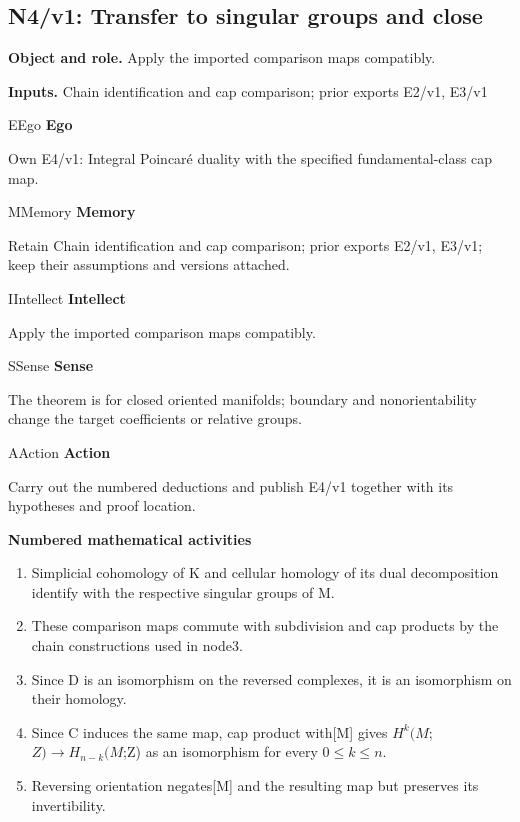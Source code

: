 \documentclass[preprint,12pt,aps,pra,showkeys,amsmath,amssymb,superscriptaddress,floatfix]{revtex4-2}
\theoremstyle{definition}
\theoremstyle{remark}
\newcommand{\mmfaculty}[3]{%
 \begin{mmfacultybox}{#1}{#2}
 {\sffamily\bfseries\color{MMBlue}#2}\par\smallskip #3
 \end{mmfacultybox}}
\newcommand{\field}[2]{\par\smallskip\noindent\textbf{#1.} #2\par}
\begin{document}
\endgroup

\clearpage

\subsection{N4/v1: Transfer to singular groups and close}

\field{Object and role}{Apply the imported comparison maps compatibly.}

\field{Inputs}{Chain identification and cap comparison; prior exports E2/v1, E3/v1}

\mmfaculty{E}{Ego}{Own E4/v1: Integral Poincaré duality with the specified
fundamental-class cap map.}

\mmfaculty{M}{Memory}{Retain Chain identification and cap comparison; prior exports E2/v1,
E3/v1; keep their assumptions and versions attached.}

\mmfaculty{I}{Intellect}{Apply the imported comparison maps compatibly.}

\mmfaculty{S}{Sense}{The theorem is for closed oriented manifolds; boundary and
nonorientability change the target coefficients or relative groups.}

\mmfaculty{A}{Action}{Carry out the numbered deductions and publish E4/v1 together with its
hypotheses and proof location.}

\smallskip\noindent\textbf{Numbered mathematical activities}

\begin{enumerate}[label=N4.\arabic*,leftmargin=3.4em]

\item Simplicial cohomology of K and cellular homology of its dual
decomposition identify with the respective singular groups of M.

\item These comparison maps commute with subdivision and cap products by the
chain constructions used in node3.

\item Since D is an isomorphism on the reversed complexes, it is an
isomorphism on their homology.

\item Since C induces the same map, cap product with{[}M{]} gives
\(H^k(M\);\(Z)\to H_{n-k}(M\);Z) as an isomorphism for every
\(0\le k\le n\).

\item Reversing orientation negates{[}M{]} and the resulting map but preserves
its invertibility.

\end{enumerate}
\end{document}
